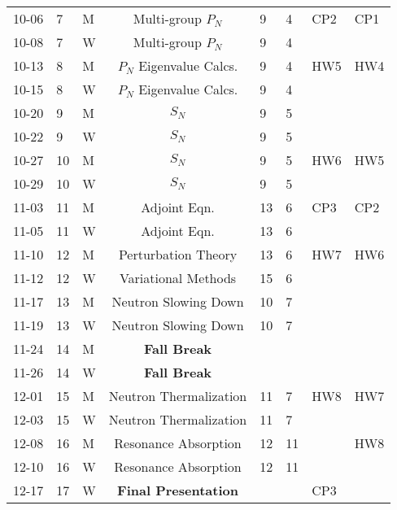 \documentclass[11pt, a4paper]{article}
\begin{document}
\begin{table}[h]
\begin{center}
\begin{tabular}{lllcllll}
10-06 & 7 & M  & Multi-group $P_N$       & 9    & 4    & CP2 & CP1 \\
10-08 & 7 & W  & Multi-group $P_N$       & 9    & 4    &     &     \\
10-13 & 8 & M  & $P_N$ Eigenvalue Calcs. & 9    & 4    & HW5 & HW4 \\
10-15 & 8 & W  & $P_N$ Eigenvalue Calcs. & 9    & 4    &     &     \\
10-20 & 9 & M  & $S_N$                   & 9    & 5    &     &     \\
10-22 & 9 & W  & $S_N$                   & 9    & 5    &     &     \\
10-27 & 10 & M & $S_N$                   & 9    & 5    & HW6 & HW5 \\
10-29 & 10 & W & $S_N$                   & 9    & 5    &     &     \\
11-03 & 11 & M & Adjoint Eqn.            & 13   & 6    & CP3 & CP2 \\
11-05 & 11 & W & Adjoint Eqn.            & 13   & 6    &     &     \\
11-10 & 12 & M & Perturbation Theory     & 13   & 6    & HW7 & HW6 \\
11-12 & 12 & W & Variational Methods     & 15   & 6    &     &     \\
11-17 & 13 & M & Neutron Slowing Down    & 10   & 7    &     &     \\
11-19 & 13 & W & Neutron Slowing Down    & 10   & 7    &     &     \\
11-24 & 14 & M & \textbf{Fall Break}     &      &      &     &     \\
11-26 & 14 & W & \textbf{Fall Break}     &      &      &     &     \\
12-01 & 15 & M & Neutron Thermalization  & 11   & 7    & HW8 & HW7 \\
12-03 & 15 & W & Neutron Thermalization  & 11   & 7    &     &     \\
12-08 & 16 & M & Resonance Absorption    & 12   & 11   &     & HW8 \\
12-10 & 16 & W & Resonance Absorption    & 12   & 11   &     &     \\
12-17 & 17 & W & \textbf{Final Presentation} &  &      & CP3 &     \\
\end{tabular}
\end{center}
\end{table}
\end{document}
